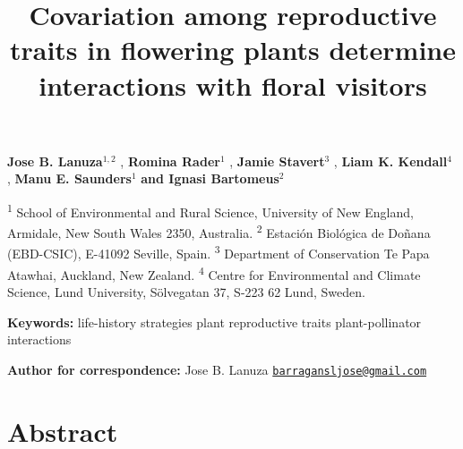 \documentclass[
  12pt,
  a4paper,
]{article}
\title{\singlespacing \vspace{-1.6cm} \LARGE Covariation among reproductive traits in flowering plants determine interactions with floral visitors}
\author{}
\date{\vspace{-2.5em}}
\begin{document}
\maketitle

\vspace{-1.4cm}

\singlespacing

\textbf{Jose B. Lanuza$^{1,2}$} , \textbf{Romina Rader$^{1}$} , \textbf{Jamie Stavert$^{3}$} , \textbf{Liam K. Kendall$^{4}$} , \textbf{Manu E. Saunders$^{1}$} 
\textbf{and Ignasi Bartomeus$^{2}$}

\small

\textsuperscript{1} School of Environmental and Rural Science, University of New England, Armidale, New South Wales 2350, Australia. \textsuperscript{2} Estación Biológica de Doñana (EBD-CSIC), E-41092 Seville, Spain. \textsuperscript{3} Department of Conservation \textbar{} Te Papa Atawhai, Auckland, New Zealand. \textsuperscript{4} Centre for Environmental and Climate Science, Lund University, Sölvegatan 37, S-223 62 Lund, Sweden.

\doublespacing
\normalsize

\textbf{Keywords:} life-history strategies \textbar{} plant reproductive traits \textbar{} plant-pollinator interactions

\textbf{Author for correspondence:} Jose B. Lanuza \textbar{} \href{mailto:barragansljose@gmail.com}{\nolinkurl{barragansljose@gmail.com}}

\hypertarget{abstract}{%
\section{Abstract}\label{abstract}}
\end{document}
